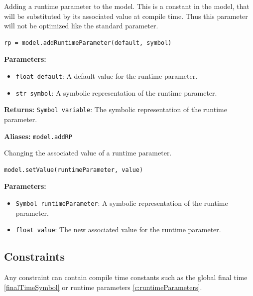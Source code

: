 \documentclass[12pt]{article}
\begin{document}
	\begin{mdframed}[backgroundcolor=gray!10, roundcorner=10pt, linewidth=1pt]
		
		Adding a runtime parameter to the model. This is a constant in the model, that will be substituted by its associated value at compile time. Thus this parameter will not be optimized like the standard parameter.
		
		\begin{lstlisting}
rp = model.addRuntimeParameter(default, symbol)
		\end{lstlisting}
		\label{addRuntimeParameter}
		\textbf{Parameters:}
		\begin{itemize}
			\item \texttt{float default}: A default value for the runtime parameter.
			\item \texttt{str symbol}: A symbolic representation of the runtime parameter.
		\end{itemize}
		
		\textbf{Returns:} 
		\texttt{Symbol variable}: The symbolic representation of the runtime parameter.
		
		\textbf{Aliases:} \texttt{model.addRP}
	\end{mdframed}
	
	\begin{mdframed}[backgroundcolor=gray!10, roundcorner=10pt, linewidth=1pt]
		
		Changing the associated value of a runtime parameter.
		
		\begin{lstlisting}
model.setValue(runtimeParameter, value)
		\end{lstlisting}
		\label{setValue}
		\textbf{Parameters:}
		\begin{itemize}
			\item \texttt{Symbol runtimeParameter}: A symbolic representation of the runtime parameter.
			\item \texttt{float value}: The new associated value for the runtime parameter.
		\end{itemize}
	\end{mdframed}
	
	
	\subsection{Constraints}
	
	Any constraint can contain compile time constants such as the global final time \ref{finalTimeSymbol} or runtime parameters \ref{c:runtimeParameters}.
	
\end{document}

